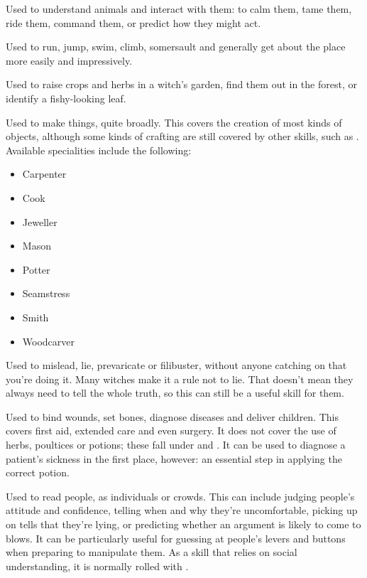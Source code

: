 
Used to understand animals and interact with them: to calm them, tame them, ride them, command them, or predict how they might act.


Used to run, jump, swim, climb, somersault and generally get about the place more easily and impressively.


Used to raise crops and herbs in a witch's garden, find them out in the forest, or identify a fishy-looking leaf.


Used to make things, quite broadly.
This covers the creation of most kinds of objects, although some kinds of crafting are still covered by other skills, such as .
Available specialities include the following:

\begin{itemize}
	\item Carpenter
	\item Cook
	\item Jeweller
	\item Mason
	\item Potter
	\item Seamstress
	\item Smith
	\item Woodcarver
\end{itemize}


Used to mislead, lie, prevaricate or filibuster, without anyone catching on that you're doing it.
Many witches make it a rule not to lie.
That doesn't mean they always need to tell the whole truth, so this can still be a useful skill for them.


Used to bind wounds, set bones, diagnose diseases and deliver children.
This covers first aid, extended care and even surgery.
It does not cover the use of herbs, poultices or potions; these fall under  and .
It can be used to diagnose a patient's sickness in the first place, however: an essential step in applying the correct potion.


Used to read people, as individuals or crowds.
This can include judging people's attitude and confidence, telling when and why they're uncomfortable, picking up on tells that they're lying, or predicting whether an argument is likely to come to blows.
It can be particularly useful for guessing at people's levers and buttons when preparing to manipulate them.
As a skill that relies on social understanding, it is normally rolled with .

